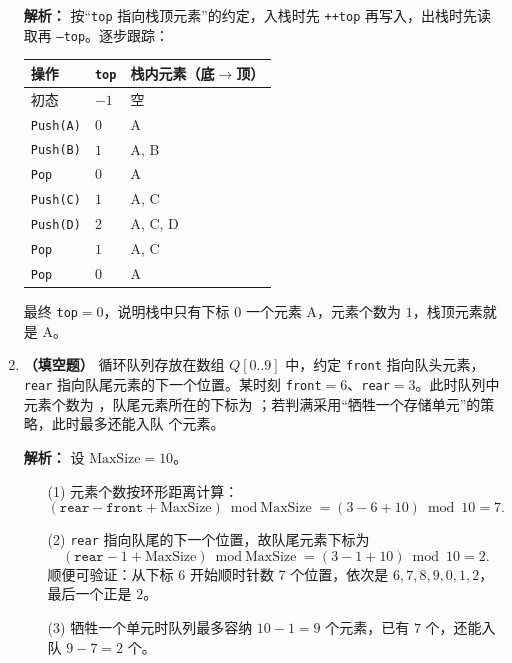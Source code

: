 \begin{enumerate}
\ifshowsolutions\par\noindent\textbf{解析：} 按“\texttt{top} 指向栈顶元素”的约定，入栈时先 \texttt{++top} 再写入，出栈时先读取再 \texttt{--top}。逐步跟踪：
\begin{center}
\begin{tabular}{lll}
\toprule
操作 & \texttt{top} & 栈内元素（底$\to$顶） \\
\midrule
初态 & $-1$ & 空 \\
\texttt{Push(A)} & $0$ & A \\
\texttt{Push(B)} & $1$ & A, B \\
\texttt{Pop} & $0$ & A \\
\texttt{Push(C)} & $1$ & A, C \\
\texttt{Push(D)} & $2$ & A, C, D \\
\texttt{Pop} & $1$ & A, C \\
\texttt{Pop} & $0$ & A \\
\bottomrule
\end{tabular}
\end{center}
最终 \texttt{top}$=0$，说明栈中只有下标 $0$ 一个元素 A，元素个数为 $1$，栈顶元素就是 A。
\par\noindent{}\else \answerarea \fi

\item \textbf{（填空题）} 循环队列存放在数组 $Q[0..9]$ 中，约定 \texttt{front} 指向队头元素，\texttt{rear} 指向队尾元素的下一个位置。某时刻 \texttt{front}$=6$、\texttt{rear}$=3$。此时队列中元素个数为 \underline{\qquad}，队尾元素所在的下标为 \underline{\qquad}；若判满采用“牺牲一个存储单元”的策略，此时最多还能入队 \underline{\qquad} 个元素。

\ifshowsolutions\par\noindent\textbf{解析：} 设 $\text{MaxSize}=10$。
\begin{enumerate}
\item[(1)] 元素个数按环形距离计算：
\[
(\texttt{rear}-\texttt{front}+\text{MaxSize})\bmod \text{MaxSize}=(3-6+10)\bmod 10=7.
\]
\item[(2)] \texttt{rear} 指向队尾的下一个位置，故队尾元素下标为
\[
(\texttt{rear}-1+\text{MaxSize})\bmod \text{MaxSize}=(3-1+10)\bmod 10=2.
\]
顺便可验证：从下标 $6$ 开始顺时针数 7 个位置，依次是 $6,7,8,9,0,1,2$，最后一个正是 $2$。
\item[(3)] 牺牲一个单元时队列最多容纳 $10-1=9$ 个元素，已有 $7$ 个，还能入队 $9-7=2$ 个。
\end{enumerate}
\par\noindent{}\else \answerarea \fi


\end{enumerate}
